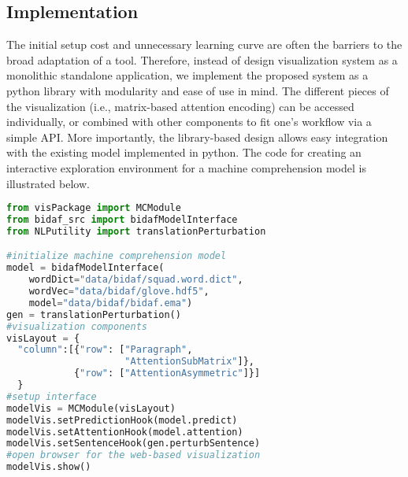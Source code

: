 \subsection{Implementation}
The initial setup cost and unnecessary learning curve are often the barriers to the broad adaptation of a tool. 
Therefore, instead of design visualization system as a monolithic standalone application, 
we implement the proposed system as a python library with modularity and ease of use in mind.
The different pieces of the visualization (i.e., matrix-based attention encoding) can be accessed individually, 
or combined with other components to fit one's workflow via a simple API.
More importantly, the library-based design allows easy integration with the existing model implemented in python.
The code for creating an interactive exploration environment for a machine comprehension model is illustrated below.

\begin{lstlisting}[language=Python, caption=Code for setting up the visualization system shown in Figure~\ref{fig:MCexample}(a).]
from visPackage import MCModule
from bidaf_src import bidafModelInterface
from NLPutility import translationPerturbation

#initialize machine comprehension model
model = bidafModelInterface(
    wordDict="data/bidaf/squad.word.dict",
    wordVec="data/bidaf/glove.hdf5",
    model="data/bidaf/bidaf.ema")
gen = translationPerturbation()
#visualization components
visLayout = {
  "column":[{"row": ["Paragraph", 
                     "AttentionSubMatrix"]},
            {"row": ["AttentionAsymmetric"]}]
  }
#setup interface
modelVis = MCModule(visLayout)
modelVis.setPredictionHook(model.predict)
modelVis.setAttentionHook(model.attention)
modelVis.setSentenceHook(gen.perturbSentence)
#open browser for the web-based visualization
modelVis.show()
\end{lstlisting}





